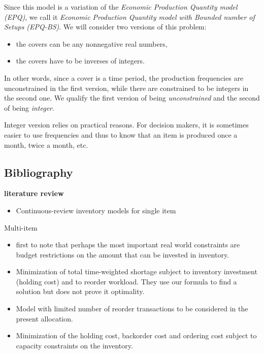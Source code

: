 \medskip


Since this model is a variation of the \emph{Economic Production Quantity model (EPQ)}, we call it \emph{Economic Production Quantity model with Bounded number of Setups (EPQ-BS)}.
We will consider two versions of this problem:
\begin{itemize}
  \item the covers can be any nonnegative real numbers,
  \item the covers have to be inverses of integers.
\end{itemize}
In other words, since a cover is a time period, the production frequencies are unconstrained in the first version, while there are constrained to be integers in the second one.
We qualify the first version of being {\em unconstrained} and the second of being {\em integer}.


Integer version relies on practical reasons.
For decision makers, it is sometimes easier to use frequencies and thus to know that an item is produced once a month, twice a month, etc.



\subsection{Bibliography}

\textbf{literature review}

\begin{itemize}
   \item \cite{Gayon2016} Continuous-review inventory models for single item
\end{itemize} 

Multi-item

\begin{itemize}
  \item \cite{Hadley1963} first to note that perhaps the most important real world constraints are budget restrictions on the amount that can be invested in inventory.
  \item \cite{Schrady1971} Minimization of total time-weighted shortage subject to inventory investment (holding cost) and to reorder workload.
  They use our formula to find a solution but does not prove it optimality.
  \item \cite{Daeschner1975} Model with limited number of reorder transactions to be considered in the present allocation.
  \item \cite{Ohno2001} Minimization of the holding cost, backorder cost and ordering cost subject to capacity constraints on the inventory.
\end{itemize}


